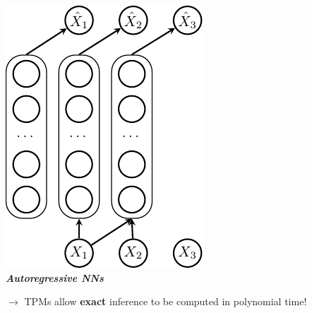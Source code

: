 \documentclass[xcolor={usenames,dvipsnames,svgnames}, compress]{beamer}
\newcommand{\cmark}{\ding{51}}%
\newcommand{\xmark}{\ding{55}}
\begin{document}
\begin{frame}[t]
\begin{center}
\begin{minipage}[t]{0.29\linewidth}
\begin{center}
        \includegraphics[width=0.8\linewidth]{figures/nade}\\
        \textbf{\emph{Autoregressive NNs}}\\[20pt]
      \end{center}
    \end{minipage}
  \end{center}\vspace{7pt}
  $\rightarrow$ TPMs allow \textbf{exact} inference to be computed in polynomial time!
\end{frame}
\end{document}
